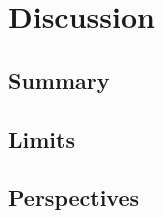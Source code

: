 \section{Discussion}
\label{sec:discussion}
\subsection{Summary}

\subsection{Limits}

\subsection{Perspectives}
